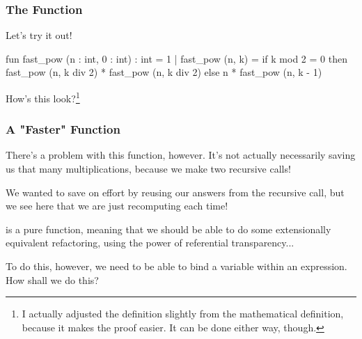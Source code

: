 \documentclass[aspectratio=169]{beamer}
\begin{document}
\begin{frame}[fragile]
  \frametitle{The  Function}

  Let's try it out!

  \pause
  \begin{codeblock}
    fun fast_pow (n : int, 0 : int) : int = 1
      | fast_pow (n, k) =
          if k mod 2 = 0 then
            fast_pow (n, k div 2) * fast_pow (n, k div 2)
          else
            n * fast_pow (n, k - 1)
  \end{codeblock}

  \vspace{\fill}

  How's this look?\footnote{I actually adjusted the definition slightly from the
  mathematical definition, because it makes the proof easier. It can be
  done either way, though.}
\end{frame}

\begin{frame}[fragile]
  \frametitle{A "Faster" Function}

  There's a problem with this function, however. It's not actually necessarily
  saving us that many multiplications, because we make two recursive calls!

  \vspace{\fill}

  We wanted to save on effort by reusing our answers from the recursive call,
  but we see here that we are just recomputing each time!

  \pause
  \vspace{\fill}

   is a pure function, meaning that we should be able to do some
  extensionally equivalent refactoring, using the power of referential
  transparency...

  \vspace{\fill}

  To do this, however, we need to be able to bind a variable within an
  expression. How shall we do this?
\end{frame}
\end{document}
